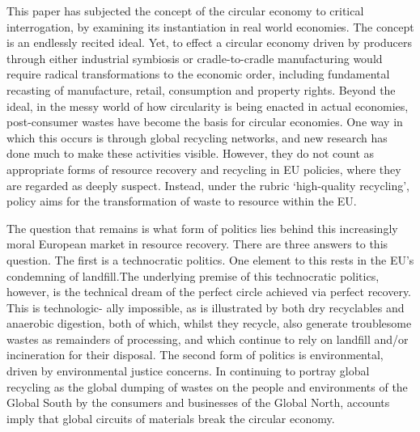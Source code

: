 This paper has subjected the concept of the circular economy to critical interrogation, by examining its instantiation in real world economies. The concept is an endlessly recited ideal. Yet, to effect a circular economy driven by producers through either industrial symbiosis or cradle-to-cradle manufacturing would require radical transformations to the economic order, including fundamental recasting of manufacture, retail, consumption and property rights. Beyond the ideal, in the messy world of how circularity is being enacted in actual economies, post-consumer wastes have become the basis for circular economies. One way in which this occurs is through global recycling networks, and new research has done much to make these activities visible. However, they do not count as appropriate forms of resource recovery and recycling in EU policies, where they are regarded as deeply suspect. Instead, under the rubric ‘high-quality recycling’, policy aims for the transformation of waste to resource within the EU. \par 


The question that remains is what form of politics lies behind this increasingly moral European market in resource recovery. There are three answers to this question. The first is a technocratic politics.
One element to this rests in the EU’s condemning of landfill.The underlying premise of this technocratic politics, however, is the technical dream of the perfect circle achieved via perfect recovery. This is technologic- ally impossible, as is illustrated by both dry recyclables and anaerobic digestion, both of which, whilst they recycle, also generate troublesome wastes as remainders of processing, and which continue to rely on landfill and/or incineration for their disposal. The second form of politics is environmental, driven by environmental
justice concerns. In continuing to portray global recycling as the global dumping of wastes on the people and environments of the Global South by the consumers and businesses of the Global North, accounts imply that global circuits of materials break the circular economy.

